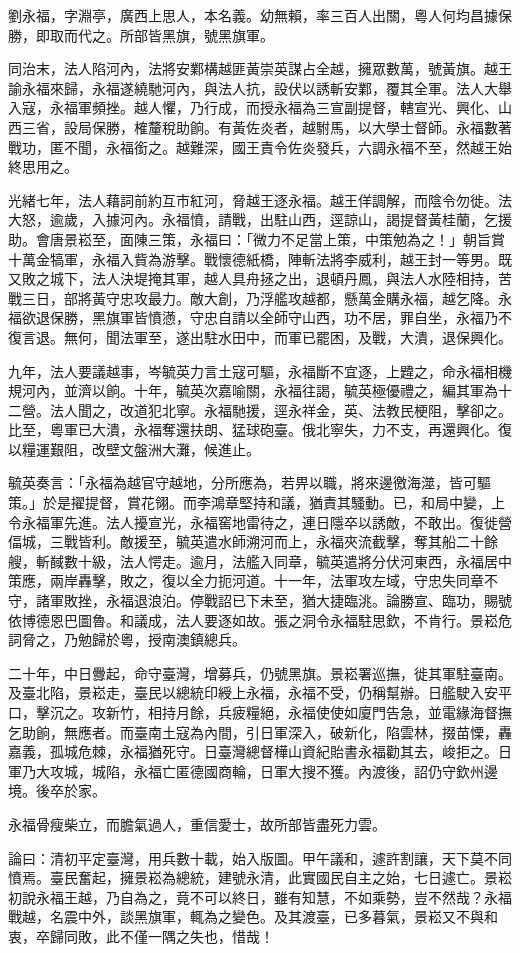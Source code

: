 \begin{pinyinscope}
劉永福，字淵亭，廣西上思人，本名義。幼無賴，率三百人出關，粵人何均昌據保勝，即取而代之。所部皆黑旗，號黑旗軍。

同治末，法人陷河內，法將安鄴構越匪黃崇英謀占全越，擁眾數萬，號黃旗。越王諭永福來歸，永福遂繞馳河內，與法人抗，設伏以誘斬安鄴，覆其全軍。法人大舉入寇，永福軍頻挫。越人懼，乃行成，而授永福為三宣副提督，轄宣光、興化、山西三省，設局保勝，榷釐稅助餉。有黃佐炎者，越駙馬，以大學士督師。永福數著戰功，匿不聞，永福銜之。越難深，國王責令佐炎發兵，六調永福不至，然越王始終思用之。

光緒七年，法人藉詞前約互市紅河，脅越王逐永福。越王佯調解，而陰令勿徙。法大怒，逾歲，入據河內。永福憤，請戰，出駐山西，逕諒山，謁提督黃桂蘭，乞援助。會唐景崧至，面陳三策，永福曰：「微力不足當上策，中策勉為之！」朝旨賞十萬金犒軍，永福入貲為游擊。戰懷德紙橋，陣斬法將李威利，越王封一等男。既又敗之城下，法人決堤掩其軍，越人具舟拯之出，退頓丹鳳，與法人水陸相持，苦戰三日，部將黃守忠攻最力。敵大創，乃浮艦攻越都，懸萬金購永福，越乞降。永福欲退保勝，黑旗軍皆憤懣，守忠自請以全師守山西，功不居，罪自坐，永福乃不復言退。無何，聞法軍至，遂出駐水田中，而軍已罷困，及戰，大潰，退保興化。

九年，法人要議越事，岑毓英力言土寇可驅，永福斷不宜逐，上韙之，命永福相機規河內，並濟以餉。十年，毓英次嘉喻關，永福往謁，毓英極優禮之，編其軍為十二營。法人聞之，改道犯北寧。永福馳援，逕永祥金，英、法教民梗阻，擊卻之。比至，粵軍已大潰，永福奪還扶朗、猛球砲臺。俄北寧失，力不支，再還興化。復以糧運艱阻，改壁文盤洲大灘，候進止。

毓英奏言：「永福為越官守越地，分所應為，若畀以職，將來邊徼海澨，皆可驅策。」於是擢提督，賞花翎。而李鴻章堅持和議，猶責其騷動。已，和局中變，上令永福軍先進。法人擾宣光，永福窖地雷待之，連日隱卒以誘敵，不敢出。復徙營偪城，三戰皆利。敵援至，毓英遣水師溯河而上，永福夾流截擊，奪其船二十餘艘，斬馘數十級，法人愕走。逾月，法艦入同章，毓英遣將分伏河東西，永福居中策應，兩岸轟擊，敗之，復以全力扼河道。十一年，法軍攻左域，守忠失同章不守，諸軍敗挫，永福退浪泊。停戰詔已下未至，猶大捷臨洮。論勝宣、臨功，賜號依博德恩巴圖魯。和議成，法人要逐如故。張之洞令永福駐思欽，不肯行。景崧危詞脅之，乃勉歸於粵，授南澳鎮總兵。

二十年，中日釁起，命守臺灣，增募兵，仍號黑旗。景崧署巡撫，徙其軍駐臺南。及臺北陷，景崧走，臺民以總統印綬上永福，永福不受，仍稱幫辦。日艦駛入安平口，擊沉之。攻新竹，相持月餘，兵疲糧絕，永福使使如廈門告急，並電緣海督撫乞助餉，無應者。而臺南土寇為內間，引日軍深入，破新化，陷雲林，掇苗慄，轟嘉義，孤城危棘，永福猶死守。日臺灣總督樺山資紀貽書永福勸其去，峻拒之。日軍乃大攻城，城陷，永福亡匿德國商輪，日軍大搜不獲。內渡後，詔仍守欽州邊境。後卒於家。

永福骨瘦柴立，而膽氣過人，重信愛士，故所部皆盡死力雲。

論曰：清初平定臺灣，用兵數十載，始入版圖。甲午議和，遽許割讓，天下莫不同憤焉。臺民奮起，擁景崧為總統，建號永清，此實國民自主之始，七日遽亡。景崧初說永福王越，乃自為之，竟不可以終日，雖有知慧，不如乘勢，豈不然哉？永福戰越，名震中外，談黑旗軍，輒為之變色。及其渡臺，已多暮氣，景崧又不與和衷，卒歸同敗，此不僅一隅之失也，惜哉！


\end{pinyinscope}